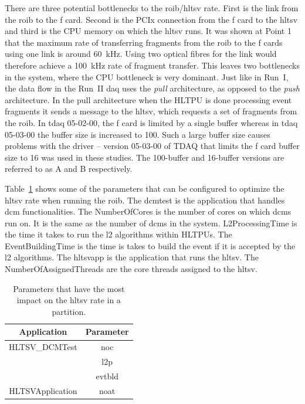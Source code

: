 \par There are three potential bottlenecks to the \acrshort{roib}/\acrshort{hltsv} rate.
 First is the link from the \acrshort{roib} to the \acrshort{f} card. Second is the PCIx connection from the
 \acrshort{f} card to the \acrshort{hltsv} and third is the CPU memory on 
which the \acrshort{hltsv} runs. It was shown at Point 1 that the maximum rate of transferring fragments 
from the \acrshort{roib} to the \acrshort{f} cards using one link is around \SI{60}{\kilo\hertz}. 
Using two optical fibres for the link would therefore achieve a \SI{100}{\kilo\hertz} 
rate of fragment transfer. This leaves two bottlenecks in the system, where the CPU bottleneck is very dominant.   
Just like in Run~I, the data flow in the Run~II \acrshort{daq} uses 
the {\it pull} architecture, as opposed to the {\it push} architecture. In the 
pull architecture when the HLTPU is done processing event fragments it sends a 
message to the \acrshort{hltsv}, which requests a set of fragments from the \acrshort{roib}.
 In tdaq 05-02-00, the \acrshort{f} card is limited by a single buffer whereas in tdaq 05-03-00
 the buffer size is increased to 100. Such a large buffer size causes problems with the 
driver -- version 05-03-00 of TDAQ that limits 
the \acrshort{f} card buffer size to 16 was used in these studies. The 100-buffer 
and 16-buffer versions are referred to as A and B respectively. 

 \par Table~\ref{parameters} shows some of the parameters that can be configured to 
optimize the \acrshort{hltsv} rate when running the \acrshort{roib}.
The \gls{dcmtest} is the application that handles \acrshort{dcm} functionalities. 
The NumberOfCores is the number of cores on which \acrshort{dcm}s run on. It is the same as 
the number of \acrshort{dcm}s in the system. L2ProcessingTime is the time it takes to run the 
\acrshort{l2} algorithms within HLTPUs. The EventBuildingTime is the time is 
takes to build the event if it is accepted by the \acrshort{l2} algorithms. 
The \gls{hltsvapp} is the application that runs the \acrshort{hltsv}. 
The NumberOfAssignedThreads are the core threads assigned to the \acrshort{hltsv}.

\begin{table}[!h]
\begin{center}
\begin{tabular}{c|c}
Application & Parameter \\
\hline\hline
HLTSV\_DCMTest & \gls{noc} \\
	& \gls{l2p} \\
	& \gls{evtbld} \\
\hline
HLTSVApplication & \gls{noat} 
\end{tabular}
\end{center}
\caption{Parameters that have the most impact on the \acrshort{hltsv} rate in a partition.}
\label{parameters}
\end{table}


